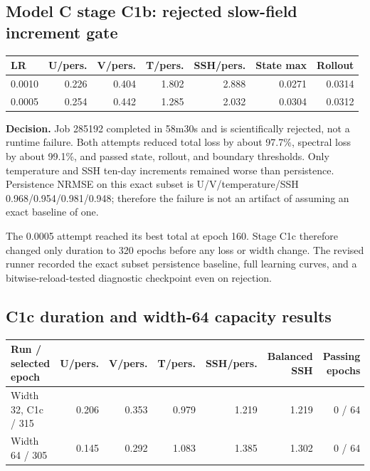 \documentclass[11pt]{article}
\begin{document}
\subsection{Model C stage C1b: rejected slow-field increment gate}

\begin{center}\small
\begin{tabular}{@{}lrrrrrr@{}}
\toprule
\textbf{LR} & \textbf{U/pers.} & \textbf{V/pers.} & \textbf{T/pers.} &
\textbf{SSH/pers.} & \textbf{State max} & \textbf{Rollout} \\
\midrule
0.0010 & 0.226 & 0.404 & 1.802 & 2.888 & 0.0271 & 0.0314 \\
0.0005 & 0.254 & 0.442 & 1.285 & 2.032 & 0.0304 & 0.0312 \\
\bottomrule
\end{tabular}
\end{center}

\textbf{Decision.}  Job 285192 completed in 58m30s and is scientifically rejected,
not a runtime failure.  Both attempts reduced total loss by about 97.7\%, spectral loss
by about 99.1\%, and passed state, rollout, and boundary thresholds.  Only temperature
and SSH ten-day increments remained worse than persistence.  Persistence NRMSE on this
exact subset is U/V/temperature/SSH 0.968/0.954/0.981/0.948; therefore the failure is
not an artifact of assuming an exact baseline of one.

The 0.0005 attempt reached its best total at epoch 160.  Stage C1c therefore changed
only duration to 320 epochs before any loss or width change.  The revised runner
recorded the exact subset persistence baseline, full learning curves, and a
bitwise-reload-tested diagnostic checkpoint even on rejection.

\subsection{C1c duration and width-64 capacity results}

\begin{center}\small
\begin{tabular}{@{}lrrrrrr@{}}
\toprule
\textbf{Run / selected epoch} & \textbf{U/pers.} & \textbf{V/pers.} &
\textbf{T/pers.} & \textbf{SSH/pers.} & \textbf{Balanced SSH} &
\textbf{Passing epochs} \\
\midrule
Width 32, C1c / 315 & 0.206 & 0.353 & 0.979 & 1.219 & 1.219 & 0 / 64 \\
Width 64 / 305 & 0.145 & 0.292 & 1.083 & 1.385 & 1.302 & 0 / 64 \\
\bottomrule
\end{tabular}
\end{center}
\end{document}
